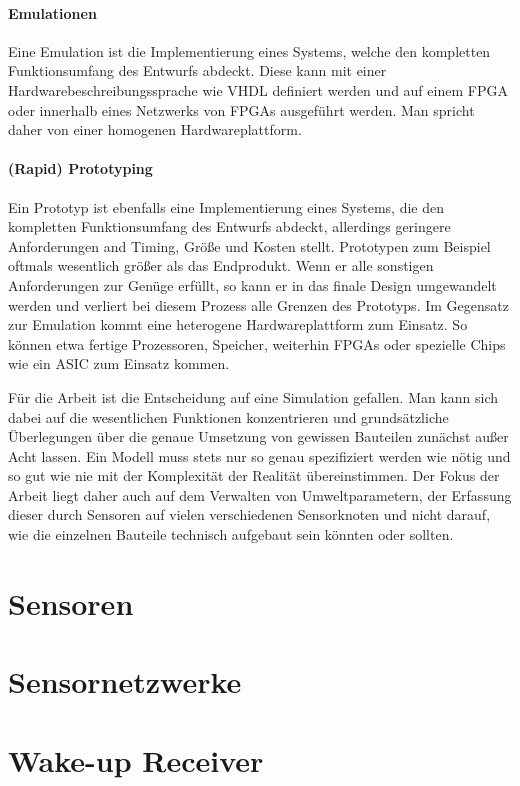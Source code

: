 \paragraph{Emulationen}

Eine Emulation ist die Implementierung eines Systems, welche den kompletten Funktionsumfang des Entwurfs abdeckt. Diese kann mit einer Hardwarebeschreibungssprache wie VHDL definiert werden und auf einem FPGA oder innerhalb eines Netzwerks von FPGAs ausgeführt werden. Man spricht daher von einer homogenen Hardwareplattform.

\paragraph{(Rapid) Prototyping}

Ein Prototyp ist ebenfalls eine Implementierung eines Systems, die den kompletten Funktionsumfang des Entwurfs abdeckt, allerdings geringere Anforderungen and Timing, Größe und Kosten stellt. Prototypen zum Beispiel oftmals wesentlich größer als das Endprodukt. Wenn er alle sonstigen Anforderungen zur Genüge erfüllt, so kann er in das finale Design umgewandelt werden und verliert bei diesem Prozess alle Grenzen des Prototyps. Im Gegensatz zur Emulation kommt eine heterogene Hardwareplattform zum Einsatz. So können etwa fertige Prozessoren, Speicher, weiterhin FPGAs oder spezielle Chips wie ein ASIC zum Einsatz kommen.

\endgraf

Für die Arbeit ist die Entscheidung auf eine Simulation gefallen. Man kann sich dabei auf die wesentlichen Funktionen konzentrieren und grundsätzliche Überlegungen über die genaue Umsetzung von gewissen Bauteilen zunächst außer Acht lassen. Ein Modell muss stets nur so genau spezifiziert werden wie nötig und so gut wie nie mit der Komplexität der Realität übereinstimmen. \newline
Der Fokus der Arbeit liegt daher auch auf dem Verwalten von Umweltparametern, der Erfassung dieser durch Sensoren auf vielen verschiedenen Sensorknoten und nicht darauf, wie die einzelnen Bauteile technisch aufgebaut sein könnten oder sollten. 



\section{Sensoren}

\section{Sensornetzwerke}

\section{Wake-up Receiver}

